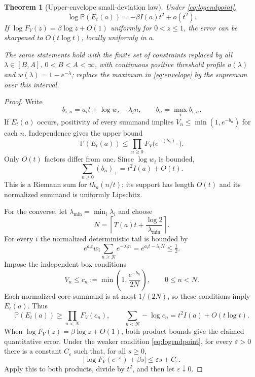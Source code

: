 \documentclass[11pt,a4paper]{article}
\newtheorem{theorem}{Theorem}[section]
\theoremstyle{definition}
\theoremstyle{remark}
\newcommand{\PP}{\mathbb P}
\newcommand{\pos}[1]{\left(#1\right)_+}
\numberwithin{equation}{section}
\begin{document}
\begin{theorem}[Upper-envelope small-deviation law]
\label{thm:leading}
Under \eqref{eq:logendpoint},
\begin{equation}
 \log\PP(E_t(a))=-\beta I(a)t^2+o(t^2).
 \label{eq:leading-law}
\end{equation}
If $\log F_V(z)=\beta\log z+O(1)$ uniformly for $0<z\le1$, the error
can be sharpened to $O(t\log t)$, locally uniformly in $a$.

The same statements hold with the finite set of constraints replaced by
all $\lambda\in[B,A]$, $0<B<A<\infty$, with continuous positive threshold
profile $a(\lambda)$ and $w(\lambda)=1-e^{-\lambda}$; replace the maximum
in \eqref{eq:envelope} by the supremum over this interval.
\end{theorem}
\begin{proof}
Write
\[
 b_{i,n}=a_it+\log w_i-\lambda_i n,
 \qquad b_n=\max_i b_{i,n}.
\]
If $E_t(a)$ occurs, positivity of every summand implies
$V_n\le\min(1,e^{-b_n})$ for each $n$. Independence gives the upper bound
\begin{equation}
 \PP(E_t(a))\le\prod_{n\ge0}F_V\bigl(e^{-\pos{b_n}}\bigr).
 \label{eq:box-upper}
\end{equation}
Only $O(t)$ factors differ from one. Since $\log w_i$ is bounded,
\begin{equation}
 \sum_{n\ge0}\pos{b_n}=t^2 I(a)+O(t).
 \label{eq:coarse-riemann}
\end{equation}
This is a Riemann sum for $t h_a(n/t)$; its support has length $O(t)$
and its normalized summand is uniformly Lipschitz.

For the converse, let $\lambda_{\min}=\min_i\lambda_i$ and choose
\[
 N=\left\lceil T(a)t+\frac{\log2}{\lambda_{\min}}\right\rceil.
\]
For every $i$ the normalized deterministic tail is bounded by
\[
 e^{a_it}w_i\sum_{n\ge N}e^{-\lambda_i n}
 =e^{a_it-\lambda_i N}\le\tfrac12.
\]
Impose the independent box conditions
\begin{equation}
 V_n\le c_n:=\min\left(1,\frac{e^{-b_n}}{2N}\right),
 \qquad 0\le n<N.
 \label{eq:box-lower}
\end{equation}
Each normalized core summand is at most $1/(2N)$, so these conditions
imply $E_t(a)$. Thus
\[
 \PP(E_t(a))\ge\prod_{n<N}F_V(c_n),\qquad
 \sum_{n<N}-\log c_n=t^2I(a)+O(t\log t).
\]
When $\log F_V(z)=\beta\log z+O(1)$, both product bounds give the
claimed quantitative error. Under the weaker condition
\eqref{eq:logendpoint}, for every $\varepsilon>0$ there is a constant
$C_\varepsilon$ such that, for all $s\ge0$,
\[
 |\log F_V(e^{-s})+\beta s|\le\varepsilon s+C_\varepsilon.
\]
Apply this to both products, divide by $t^2$, and then let
$\varepsilon\downarrow0$.


\end{proof}
\end{document}
